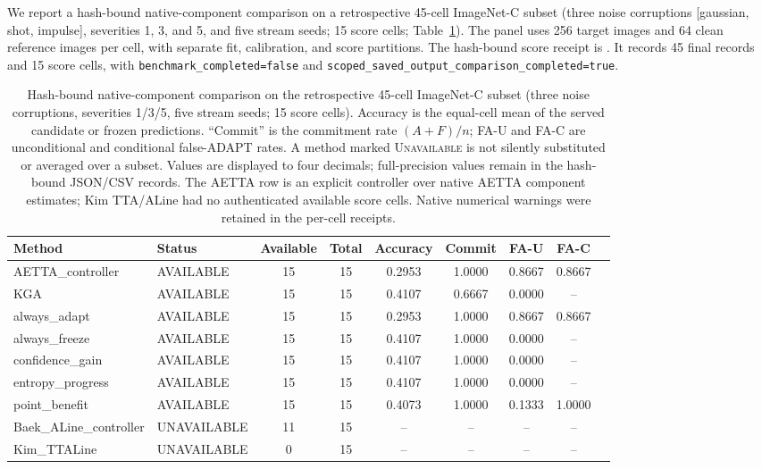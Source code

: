 We report a hash-bound native-component comparison on a retrospective 45-cell ImageNet-C subset
(three noise corruptions [gaussian, shot, impulse], severities 1, 3, and 5, and five stream seeds;
15 score cells; Table~\ref{tab:native-component-45}). The panel uses 256 target images and 64 clean
reference images per cell, with separate fit, calibration, and score partitions. The hash-bound score
receipt is .
It records 45 final records and 15 score cells, with \texttt{benchmark\_completed=false} and
\texttt{scoped\_saved\_output\_comparison\_completed=true}.

\begin{table}[t]
\centering
\small
\caption{Hash-bound native-component comparison on the retrospective 45-cell ImageNet-C subset (three noise corruptions, severities 1/3/5, five stream seeds; 15 score cells). Accuracy is the equal-cell mean of the served candidate or frozen predictions. ``Commit'' is the commitment rate $(A + F)/n$; FA-U and FA-C are unconditional and conditional false-ADAPT rates. A method marked \textsc{Unavailable} is not silently substituted or averaged over a subset. Values are displayed to four decimals; full-precision values remain in the hash-bound JSON/CSV records. The AETTA row is an explicit controller over native AETTA component estimates; Kim TTA/ALine had no authenticated available score cells. Native numerical warnings were retained in the per-cell receipts.}
\label{tab:native-component-45}
\begin{tabular}{@{}llccccccc@{}}
\toprule
Method & Status & Available & Total & Accuracy & Commit & FA-U & FA-C \\
\midrule
AETTA\_controller       & AVAILABLE   & 15 & 15 & 0.2953 & 1.0000 & 0.8667 & 0.8667 \\
KGA                     & AVAILABLE   & 15 & 15 & 0.4107 & 0.6667 & 0.0000 & --     \\
always\_adapt           & AVAILABLE   & 15 & 15 & 0.2953 & 1.0000 & 0.8667 & 0.8667 \\
always\_freeze          & AVAILABLE   & 15 & 15 & 0.4107 & 1.0000 & 0.0000 & --     \\
confidence\_gain        & AVAILABLE   & 15 & 15 & 0.4107 & 1.0000 & 0.0000 & --     \\
entropy\_progress       & AVAILABLE   & 15 & 15 & 0.4107 & 1.0000 & 0.0000 & --     \\
point\_benefit          & AVAILABLE   & 15 & 15 & 0.4073 & 1.0000 & 0.1333 & 1.0000 \\
Baek\_ALine\_controller & UNAVAILABLE & 11 & 15 & --     & --     & --     & --     \\
Kim\_TTALine            & UNAVAILABLE &  0 & 15 & --     & --     & --     & --     \\
\bottomrule
\end{tabular}
\end{table}

